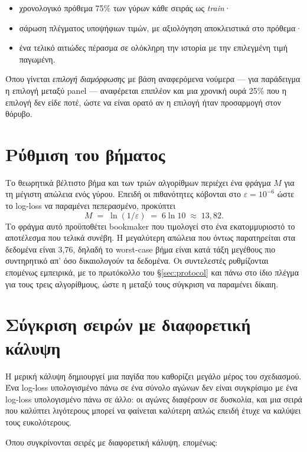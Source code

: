 \documentclass[12pt,a4paper,oneside]{report}
\renewcommand{\_}{\oldunderscore\allowbreak}
\theoremstyle{definition}
\theoremstyle{plain}
\theoremstyle{remark}
\begin{document}
\begin{itemize}
  \item χρονολογικό πρόθεμα 75\% των γύρων κάθε σειράς ως \emph{train}·
  \item σάρωση πλέγματος υποψήφιων τιμών, με αξιολόγηση αποκλειστικά στο πρόθεμα·
  \item ένα τελικό αιτιώδες πέρασμα σε ολόκληρη την ιστορία με την επιλεγμένη τιμή παγωμένη.
\end{itemize}

Όπου γίνεται \emph{επιλογή διαμόρφωσης} με βάση αναφερόμενα νούμερα --- για παράδειγμα η
επιλογή μεταξύ panel --- αναφέρεται επιπλέον και μια χρονική ουρά 25\% που η επιλογή δεν
είδε ποτέ, ώστε να είναι ορατό αν η επιλογή ήταν προσαρμογή στον θόρυβο.

\section{Ρύθμιση του βήματος}

Το θεωρητικά βέλτιστο βήμα και των τριών αλγορίθμων περιέχει ένα φράγμα $M$ για τη μέγιστη
απώλεια ενός γύρου. Επειδή οι πιθανότητες κόβονται στο $\varepsilon = 10^{-6}$ ώστε το
log-loss να παραμένει πεπερασμένο, προκύπτει
\[
M \;=\; \ln(1/\varepsilon) \;=\; 6\ln 10 \;\approx\; 13{,}82 .
\]
Το φράγμα αυτό προϋποθέτει bookmaker που τιμολογεί στο ένα εκατομμυριοστό το αποτέλεσμα που
τελικά συνέβη. Η μεγαλύτερη απώλεια που όντως παρατηρείται στα δεδομένα είναι 3,76, δηλαδή
το worst-case βήμα είναι κατά τάξη μεγέθους πιο συντηρητικό απ' όσο δικαιολογούν τα
δεδομένα. Οι συντελεστές ρυθμίζονται επομένως εμπειρικά, με το πρωτόκολλο του
\S\ref{sec:protocol} και πάνω στο ίδιο πλέγμα για τους τρεις αλγορίθμους, ώστε η μεταξύ τους
σύγκριση να παραμένει δίκαιη.

\section{Σύγκριση σειρών με διαφορετική κάλυψη}
\label{sec:common-rounds}

Η μερική κάλυψη δημιουργεί μια παγίδα που καθορίζει μεγάλο μέρος του σχεδιασμού. Ένα
log-loss υπολογισμένο πάνω σε ένα σύνολο αγώνων δεν είναι συγκρίσιμο με ένα log-loss
υπολογισμένο πάνω σε άλλο: οι αγώνες διαφέρουν σε δυσκολία, και μια σειρά που καλύπτει
λιγότερους μπορεί να φαίνεται καλύτερη απλώς επειδή έτυχε να καλύψει τους ευκολότερους.

Όπου συγκρίνονται σειρές με διαφορετική κάλυψη, επομένως:
\end{document}
